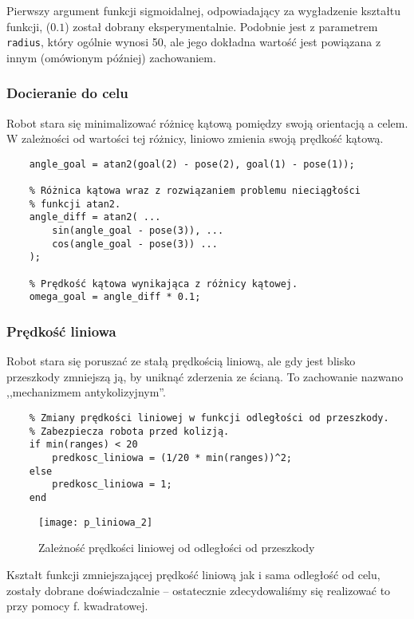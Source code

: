 \documentclass[11pt]{article}
\begin{document}
Pierwszy argument funkcji sigmoidalnej, odpowiadający za wygładzenie kształtu funkcji, ($0.1$) został dobrany eksperymentalnie. Podobnie jest z parametrem \texttt{radius}, który ogólnie wynosi 50, ale jego dokładna wartość jest powiązana z innym (omówionym później) zachowaniem.

\subsubsection*{Docieranie do celu}

Robot stara się minimalizować różnicę kątową pomiędzy swoją orientacją a celem. W zależności od wartości tej różnicy, liniowo zmienia swoją prędkość kątową.

\begin{lstlisting}[firstnumber = 83]
    % Kąt celu.
    angle_goal = atan2(goal(2) - pose(2), goal(1) - pose(1));
    
    % Różnica kątowa wraz z rozwiązaniem problemu nieciągłości
    % funkcji atan2.
    angle_diff = atan2( ...
        sin(angle_goal - pose(3)), ...
        cos(angle_goal - pose(3)) ...
    );

    % Prędkość kątowa wynikająca z różnicy kątowej.
    omega_goal = angle_diff * 0.1;
\end{lstlisting}

\subsubsection*{Prędkość liniowa}

Robot stara się poruszać ze stałą prędkością liniową, ale gdy jest blisko przeszkody zmniejszą ją, by uniknąć zderzenia ze ścianą. To zachowanie nazwano ,,mechanizmem antykolizyjnym''.
\begin{lstlisting}[firstnumber = 102]
    % Mechanizm antykolizyjny.
    % Zmiany prędkości liniowej w funkcji odległości od przeszkody.
    % Zabezpiecza robota przed kolizją.
    if min(ranges) < 20
        predkosc_liniowa = (1/20 * min(ranges))^2;
    else
        predkosc_liniowa = 1;
    end
\end{lstlisting}

\begin{figure}[h!]
	\centering
	\texttt{[image: p\_liniowa\_2]}
	\caption{Zależność prędkości liniowej od odległości od przeszkody}
\end{figure}

Kształt funkcji zmniejszającej prędkość liniową jak i sama odległość od celu, zostały dobrane doświadczalnie -- ostatecznie zdecydowaliśmy się realizować to przy pomocy f. kwadratowej.
\end{document}
